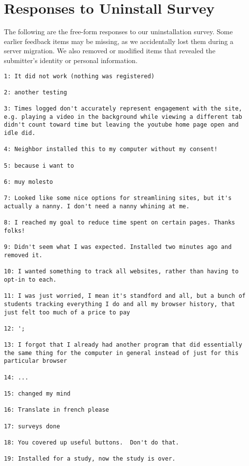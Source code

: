 \chapter{Responses to Uninstall Survey}
\label{ch:uninstall}

The following are the free-form responses to our uninstallation survey. Some earlier feedback items may be missing, as we accidentally lost them during a server migration. We also removed or modified items that revealed the submitter's identity or personal information.

\begin{lstlisting}[breaklines]
1: It did not work (nothing was registered)

2: another testing

3: Times logged don't accurately represent engagement with the site, e.g. playing a video in the background while viewing a different tab didn't count toward time but leaving the youtube home page open and idle did.

4: Neighbor installed this to my computer without my consent!

5: because i want to

6: muy molesto

7: Looked like some nice options for streamlining sites, but it's actually a nanny. I don't need a nanny whining at me.

8: I reached my goal to reduce time spent on certain pages. Thanks folks!

9: Didn't seem what I was expected. Installed two minutes ago and removed it.

10: I wanted something to track all websites, rather than having to opt-in to each.

11: I was just worried, I mean it's standford and all, but a bunch of students tracking everything I do and all my browser history, that just felt too much of a price to pay

12: ';

13: I forgot that I already had another program that did essentially the same thing for the computer in general instead of just for this particular browser

14: ...

15: changed my mind

16: Translate in french please

17: surveys done

18: You covered up useful buttons.  Don't do that.

19: Installed for a study, now the study is over.


\end{lstlisting}
